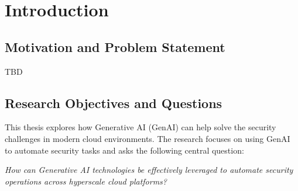 
\chapter{Introduction}
\label{chap:introduction}


\newcommand{\keyword}[1]{\textbf{#1}}
\newcommand{\tabhead}[1]{\textbf{#1}}
\newcommand{\code}[1]{\texttt{#1}}
\newcommand{\file}[1]{\texttt{\bfseries#1}}
\newcommand{\option}[1]{\texttt{\itshape#1}}


\section{Motivation and Problem Statement}
\label{sec:motivation_problem}

TBD

\section{Research Objectives and Questions}
\label{sec:objectives_questions}

This thesis explores how Generative AI (GenAI) can help solve the security challenges in modern cloud environments. The research focuses on using GenAI to automate security tasks and asks the following central question:

\textit{How can Generative AI technologies be effectively leveraged to automate security operations across hyperscale cloud platforms?}

